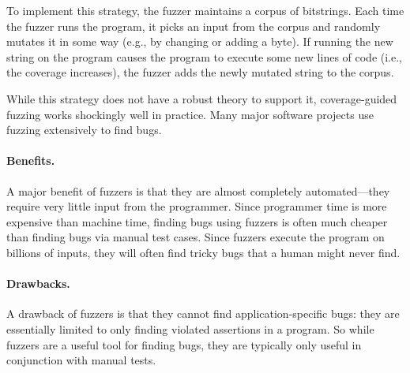 To implement this strategy, the fuzzer maintains a corpus of bitstrings.
Each time the fuzzer runs the program, it picks an input from the
corpus and randomly mutates it in some way (e.g., by changing or adding a byte).
If running the new string on the program causes the program to execute
some new lines of code (i.e., the coverage increases), the fuzzer adds
the newly mutated string to the corpus.

While this strategy does not have a robust theory to support it, 
coverage-guided fuzzing works shockingly well in practice.
Many major software projects use fuzzing extensively to find bugs.


\paragraph{Benefits.}
A major benefit of fuzzers is that they are almost completely automated---they
require very little input from the programmer. Since programmer time is more
expensive than machine time, finding bugs using fuzzers is often much cheaper
than finding bugs via manual test cases.
Since fuzzers execute the program on billions of inputs, they will 
often find tricky bugs that a human might never find.

\paragraph{Drawbacks.}
A drawback of fuzzers is that they cannot find application-specific bugs:
they are essentially limited to only finding violated assertions in a program.
So while fuzzers are a useful tool for finding bugs, they are typically only 
useful in conjunction with manual tests.


